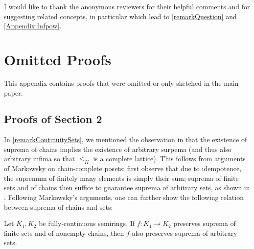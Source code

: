 \documentclass[english,runningheads,a4paper,envcountsame]{llncs}
\newcommand*{\co}{\colon}
\begin{document}
I would like to thank the anonymous reviewers for their helpful comments and for suggesting related concepts, in particular \cite{Cohen00,GGS19,GondranMinoux08} which lead to \cref{remarkQuestion} and \cref{Appendix:Infpow}.





\renewcommand{\doi}[1]{\url{https://doi.org/#1}} %
\renewcommand{\doi}[1]{\href{https://doi.org/#1}{\texttt{doi:#1}}} %




\clearpage
\appendix

\renewcommand{\thelemma}{\thesection\arabic{theorem}}
\renewcommand{\theproposition}{\thesection\arabic{theorem}}
\setcounter{theorem}{0}

\section{Omitted Proofs}
\label{Appendix:Proofs}

This appendix contains proofs that were omitted or only sketched in the main paper.

\subsection{Proofs of Section 2}

In \cref{remarkContinuitySets}, we mentioned the observation in \cite{DannertGraNaaTan21} that the existence of suprema of chains implies the existence of arbitrary surpema (and thus also arbitrary infima so that $\le_K$ is a complete lattice).
This follows from arguments of Markowsky \cite{Markowsky76} on chain-complete posets:
first observe that due to idempotence, the supremum of finitely many elements is simply their sum; suprema of finite sets and of chains then suffice to guarantee suprema of arbitrary sets, as shown in \cite[Corollary 5]{Markowsky76}.
Following Markowsky's arguments, one can further show the following relation between suprema of chains and sets:

\begin{lemma}
Let $K_1,K_2$ be fully-continuous semirings.
If $f \co K_1 \to K_2$ preserves suprema of finite sets and of nonempty chains, then $f$ also preserves suprema of arbitrary sets.
\end{lemma}
\end{document}
